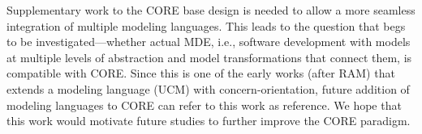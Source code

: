 Supplementary work to the CORE base design is needed to allow a more seamless integration of multiple modeling languages. This leads to the question that begs to be investigated---whether actual MDE, i.e., software development with models at multiple levels of abstraction and model transformations that connect them, is compatible with CORE. Since this is one of the early works (after RAM) that extends a modeling language (UCM) with concern-orientation, future addition of modeling languages to CORE can refer to this work as reference. We hope that this work would motivate future studies to further improve the CORE paradigm.
